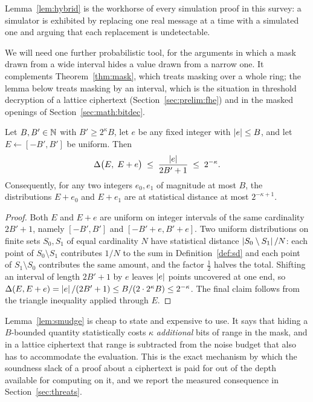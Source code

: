 Lemma~\ref{lem:hybrid} is the workhorse of every simulation proof in this survey:
a simulator is exhibited by replacing one real message at a time with a simulated
one and arguing that each replacement is undetectable.

We will need one further probabilistic tool, for the arguments in which a mask
drawn from a wide interval hides a value drawn from a narrow one. It complements
Theorem~\ref{thm:mask}, which treats masking over a whole ring; the lemma below
treats masking by an interval, which is the situation in threshold decryption of a
lattice ciphertext (Section~\ref{sec:prelim:fhe}) and in the masked openings of
Section~\ref{sec:math:bitdec}.

\begin{lemma}[Smudging]
\label{lem:smudge}
Let $B, B' \in \mathbb{N}$ with $B' \ge 2^{\kappa} B$, let $e$ be any fixed integer with
$\left\lvert e \right\rvert \le B$, and let $E \gets [-B',B']$ be uniform. Then
\[
  \Delta\bigl(E,\; E + e\bigr) \;\le\; \frac{\left\lvert e \right\rvert}{2B'+1} \;\le\; 2^{-\kappa}.
\]
Consequently, for any two integers $e_0,e_1$ of magnitude at most $B$, the
distributions $E+e_0$ and $E+e_1$ are at statistical distance at most
$2^{-\kappa+1}$.
\end{lemma}

\begin{proof}
Both $E$ and $E+e$ are uniform on integer intervals of the same cardinality
$2B'+1$, namely $[-B',B']$ and $[-B'+e, B'+e]$. Two uniform distributions on
finite sets $S_0, S_1$ of equal cardinality $N$ have statistical distance
$\left\lvert S_0 \setminus S_1 \right\rvert/N$: each point of $S_0\setminus S_1$ contributes
$1/N$ to the sum in Definition~\ref{def:sd} and each point of
$S_1 \setminus S_0$ contributes the same amount, and the factor $\tfrac12$
halves the total. Shifting an interval of length $2B'+1$ by $e$ leaves
$\left\lvert e \right\rvert$ points uncovered at one end, so
$\Delta(E, E+e) = \left\lvert e \right\rvert/(2B'+1) \le B/(2\cdot 2^{\kappa}B) \le 2^{-\kappa}$. The
final claim follows from the triangle inequality applied through $E$.
\end{proof}

\begin{remark}
\label{rem:smudge-cost}
Lemma~\ref{lem:smudge} is cheap to state and expensive to use. It says that
hiding a $B$-bounded quantity statistically costs $\kappa$ \emph{additional} bits
of range in the mask, and in a lattice ciphertext that range is subtracted from
the noise budget that also has to accommodate the evaluation. This is the exact
mechanism by which the soundness slack of a proof about a ciphertext is paid for
out of the depth available for computing on it, and we report the measured
consequence in Section~\ref{sec:threats}.
\end{remark}

